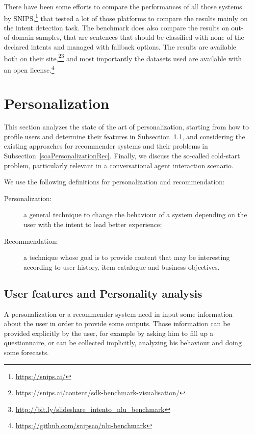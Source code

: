 There have been some efforts to compare the performances of all those systems by SNIPS,\footnote{\url{https://snips.ai/}} that tested a lot of those platforms to compare the results mainly on the intent detection task. The benchmark does also compare the results on out-of-domain samples, that are sentences that should be classified with none of the declared intents and managed with fallback options. The results are available both on their site,\footnote{\url{https://snips.ai/content/sdk-benchmark-visualisation/}}\footnote{\url{http://bit.ly/slideshare_intento_nlu_benchmark}} and most importantly the datasets used are available with an open license.\footnote{\url{https://github.com/snipsco/nlu-benchmark}}

\section{Personalization}
\label{soaPersonalization}

This section analyzes the state of the art of personalization, starting from how to profile users and determine their features in Subsection~\ref{soaPersonalizationFeatures}, and considering the existing approaches for recommender systems and their problems in Subsection~\ref{soaPersonalizationRec}. Finally, we discuss the so-called cold-start problem, particularly relevant in a conversational agent interaction scenario.

We use the following definitions for personalization and recommendation:

\begin{description}
	\item[Personalization:] a general technique to change the behaviour of a system depending on the user with the intent to lead better experience;
	\item[Recommendation:] a technique whose goal is to provide content that may be interesting according to user history, item catalogue and business objectives.
\end{description}

\subsection{User features and Personality analysis}
\label{soaPersonalizationFeatures}

A personalization or a recommender system need in input some information about the user in order to provide some outputs. Those information can be provided explicitly by the user, for example by asking him to fill up a questionnaire, or can be collected implicitly, analyzing his behaviour and doing some forecasts.

